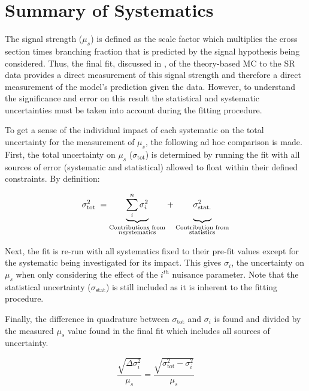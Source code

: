 \section{Summary of Systematics} \label{sec:systematics:summary}

The signal strength ($\mu_{s}$) is defined as the scale factor which multiplies
the cross section times branching fraction that is predicted by the signal
hypothesis being considered.  Thus, the final fit, discussed in
, of the theory-based MC to the SR data provides a direct
measurement of this signal strength and therefore a direct measurement of the
model's prediction given the data. However, to understand the significance and
error on this result the statistical and systematic uncertainties must be taken
into account during the fitting procedure.

To get a sense of the individual impact of each systematic on the total
uncertainty for the measurement of $\mu_{s}$, the following ad hoc comparison
is made.  First, the total uncertainty on $\mu_{s}$ ($\sigma_{\text{tot}}$) is
determined by running the fit with all sources of error (systematic and
statistical) allowed to float within their defined constraints.  By definition:

\begin{equation}
 \sigma_{\text{tot}}^{2} \; = {\underbrace{\sum_{i}^{n} \sigma_{i}^{2}}_{\substack{\text{Contributions from} \\ n \text{systematics}}}} + {\underbrace{\vphantom{\sum_{i}^{n}} \sigma_{\text{stat.}}^{2}}_{\substack{\text{Contribution from} \\ \text{statistics}}}}
\end{equation}

Next, the fit is re-run with all systematics fixed to their pre-fit values
except for the systematic being investigated for its impact. This gives
$\sigma_{i}$, the uncertainty on $\mu_{s}$ when only considering the effect of
the $i^{th}$ nuisance parameter. Note that the statistical uncertainty
($\sigma_{\text{stat}}$) is still included as it is inherent to the fitting
procedure.

Finally, the difference in quadrature between $\sigma_{\text{tot}}$ and
$\sigma_{i}$ is found and divided by the measured $\mu_{s}$ value found in the
final fit which includes all sources of uncertainty. 

\begin{equation} 
\frac{\sqrt{\Delta \sigma_i^2}}{\mu_{s}} = \frac{\sqrt{\sigma_{\text{tot}}^2 - \sigma_i^2}}{\mu_{s}}
\end{equation}

